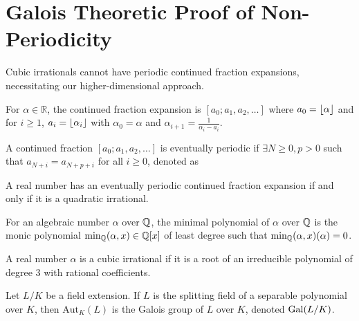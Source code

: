 \section{Galois Theoretic Proof of Non-Periodicity}\label{sec:galois_theory}

Cubic irrationals cannot have periodic continued fraction expansions, necessitating our higher-dimensional approach.

\begin{definition}
For $\alpha \in \mathbb{R}$, the continued fraction expansion is $[a_0; a_1, a_2, \ldots]$ where $a_0 = \lfloor \alpha \rfloor$ and for $i \geq 1$, $a_i = \lfloor \alpha_i \rfloor$ with $\alpha_0 = \alpha$ and $\alpha_{i+1} = \frac{1}{\alpha_i - a_i}$.
\end{definition}

\begin{definition}
A continued fraction $[a_0; a_1, a_2, \ldots]$ is eventually periodic if $\exists N \geq 0, p > 0$ such that $a_{N+i} = a_{N+p+i}$ for all $i \geq 0$, denoted as 
\begin{equation}
[a_0; a_1, \ldots, a_{N-1}, \overline{a_N, \ldots, a_{N+p-1}}]
\end{equation}
\end{definition}

\begin{theorem}[Lagrange]\label{thm:lagrange}
A real number has an eventually periodic continued fraction expansion if and only if it is a quadratic irrational.
\end{theorem}

\begin{definition}
For an algebraic number $\alpha$ over $\mathbb{Q}$, the minimal polynomial of $\alpha$ over $\mathbb{Q}$ is the monic polynomial $\text{min}_{\mathbb{Q}}(\alpha, x) \in \mathbb{Q}[x]$ of least degree such that $\text{min}_{\mathbb{Q}}(\alpha, x)(\alpha) = 0$.
\end{definition}

\begin{definition}
A real number $\alpha$ is a cubic irrational if it is a root of an irreducible polynomial of degree 3 with rational coefficients.
\end{definition}

\begin{definition}
Let $L/K$ be a field extension. If $L$ is the splitting field of a 
separable polynomial over $K$, then $\text{Aut}_K(L)$ is the Galois group 
of $L$ over $K$, denoted $\operatorname{Gal}(L/K)$.
\end{definition}

